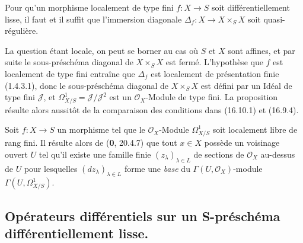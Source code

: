 \begin{proposition}[16.10.5]
\label{IV.16.10.5}
Pour qu'un morphisme localement de type fini $f:X\to S$ soit
différentiellement lisse, il faut et il suffit que l'immersion diagonale
$\Delta_f:X\to X\times_S X$ soit quasi-régulière.
\end{proposition}


La question étant locale, on peut se borner au cas où $S$ et $X$ sont
affines, et par suite le sous-préschéma diagonal de $X\times_S X$ est fermé.
L'hypothèse que $f$ est localement de type fini entraîne que $\Delta_f$ est
localement de présentation finie (1.4.3.1), donc le sous-préschéma diagonal
de $X\times_S X$ est défini par un Idéal de type fini $\mathscr{J}$, et
$\varOmega_{X/S}^1=\mathscr{J}/\mathscr{J}^2$ est un $\mathcal{O}_X$-Module de
type fini. La proposition résulte alors aussitôt de la comparaison des
conditions dans (16.10.1) et (16.9.4).

\begin{remark}[16.10.6]
\label{IV.16.10.6}
Soit $f:X\to S$ un morphisme tel que le $\mathcal{O}_X$-Module
$\varOmega_{X/S}^1$ soit localement libre de rang fini. Il résulte alors de
(\textbf{0}, 20.4.7) que tout $x\in X$ possède un voisinage ouvert $U$ tel qu'il existe
une famille finie $(z_\lambda)_{\lambda\in L}$ de sections de
$\mathcal{O}_X$ au-dessus de $U$ pour lesquelles $(dz_\lambda)_{\lambda\in L}$
forme une \emph{base} du $\Gamma(U,\mathcal{O}_X)$-module
$\Gamma(U,\varOmega_{X/S}^1)$.
\end{remark}

\subsection{\texorpdfstring{Opérateurs différentiels sur un S-préschéma différentiellement
lisse.}{Opérateurs différentiels sur un S-préschéma différentiellement lisse}}

